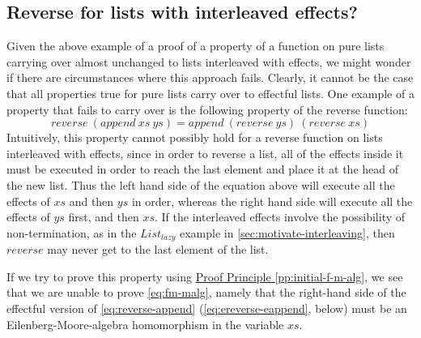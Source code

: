 \documentclass{jfp1}
\newcommand{\proofprinref}[1]{\hyperref[#1]{Proof Principle \ref*{#1}}}
\begin{document}
\subsection{Reverse for lists with interleaved effects?}
\label{sec:reverse}

Given the above example of a proof of a property of a function on pure
lists carrying over almost unchanged to lists interleaved with
effects, we might wonder if there are circumstances where this
approach fails. Clearly, it cannot be the case that all properties
true for pure lists carry over to effectful lists. One example of a
property that fails to carry over is the following property of the
reverse function:
\begin{equation}\label{eq:reverse-append}
  \mathit{reverse}~(\mathit{append}~\mathit{xs}~\mathit{ys}) = \mathit{append}~(\mathit{reverse}~\mathit{ys})~(\mathit{reverse}~\mathit{xs})
\end{equation}
Intuitively, this property cannot possibly hold for a reverse function
on lists interleaved with effects, since in order to reverse a list,
all of the effects inside it must be executed in order to reach the
last element and place it at the head of the new list. Thus the left
hand side of the equation above will execute all the effects of
$\mathit{xs}$ and then $\mathit{ys}$ in order, whereas the right hand
side will execute all the effects of $\mathit{ys}$ first, and then
$\mathit{xs}$. If the interleaved effects involve the possibility of
non-termination, as in the $\mathit{List_{lazy}}$ example in
\autoref{sec:motivate-interleaving}, then $\mathit{reverse}$ may never
get to the last element of the list.

If we try to prove this property using
\proofprinref{pp:initial-f-m-alg}, we see that we are unable to prove
\autoref{eq:fm-malg}, namely that the right-hand side of the effectful
version of \autoref{eq:reverse-append} (\autoref{eq:ereverse-eappend},
below) must be an Eilenberg-Moore-algebra homomorphism in the variable
$\mathit{xs}$.
\end{document}
